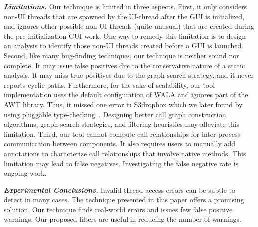 \vspace{1mm}

\noindent \textbf{\textit{Limitations.}}
Our technique is limited in three aspects. First, it only considers
non-UI threads that are spawned by the UI-thread after the GUI
is initialized, and ignores other possible non-UI threads (quite unusual)
that are created during the pre-initialization GUI work. One way
to remedy this limitation is to design an analysis to identify
those non-UI threads created before a GUI is launched.
Second, like many bug-finding techniques, our technique
is neither sound nor complete. It may issue false positives
due to the conservative nature of a static analysis.
It may miss true positives due to the graph search strategy,
and it never reports cyclic paths. Furthermore, for the
sake of scalability, our tool implementation uses the default
configuration of WALA and ignores part of the AWT library. Thus,
it missed one error in S3dropbox which we later found by using pluggable type-checking~\cite{DietlDEMS2011}.
Designing better call graph construction algorithms,
graph search strategies, and filtering heuristics may alleviate this limitation.
Third, our tool cannot compute call relationships
for inter-process communication between components. It also
requires users to manually add annotations to characterize
call relationships that involve native methods. This limitation
may lead to false negatives. Investigating the false negative
rate is ongoing work.


\vspace{1mm}

\noindent \textbf{\textit{Experimental Conclusions.}}
Invalid thread access errors  can be subtle to detect in many cases.
The technique presented in this paper offers a promising solution.
Our technique finds real-world errors and issues
few false positive warnings. Our
proposed filters are useful in reducing the number of warnings.



